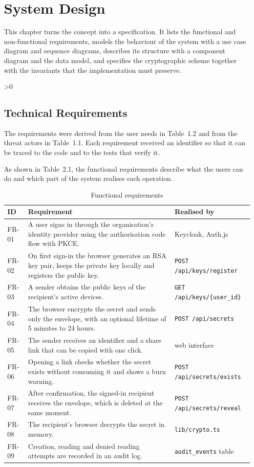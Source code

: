 \documentclass[12pt,a4paper]{article}
\numberwithin{equation}{section}
\numberwithin{figure}{section}
\numberwithin{table}{section}
\newcommand{\subsec}[1]{%
  \ifnum\value{subsection}>0\clearpage\fi
  \subsection{#1}%
}
\newcommand{\tablesetup}{\fontsize{11pt}{13pt}\selectfont\singlespacing\renewcommand{\arraystretch}{1.15}}
\newcommand{\leadin}[1]{%
  {\onehalfspacing\setlength{\parindent}{1.25cm}\indent #1\par}\vspace{8pt}}
\begin{document}
\clearpage
\section{System Design}

This chapter turns the concept into a specification. It lists the functional and non-functional requirements, models the behaviour of the system with a use case diagram and sequence diagrams, describes its structure with a component diagram and the data model, and specifies the cryptographic scheme together with the invariants that the implementation must preserve.

\subsec{Technical Requirements}

The requirements were derived from the user needs in Table~1.2 and from the threat actors in Table~1.1. Each requirement received an identifier so that it can be traced to the code and to the tests that verify it.

\begin{table}[H]
\leadin{As shown in Table~2.1, the functional requirements describe what the users can do and which part of the system realises each operation.}
\tablesetup
\caption{Functional requirements}
\label{tab:fr}
\begin{tabularx}{\textwidth}{|P{0.08\textwidth}|L|P{0.29\textwidth}|}
\hline
\textbf{ID} & \textbf{Requirement} & \textbf{Realised by} \\ \hline
FR-01 & A user signs in through the organisation's identity provider using the authorisation code flow with PKCE. & Keycloak, Auth.js \\ \hline
FR-02 & On first sign-in the browser generates an RSA key pair, keeps the private key locally and registers the public key. & \texttt{POST /api/keys/register} \\ \hline
FR-03 & A sender obtains the public keys of the recipient's active devices. & \texttt{GET /api/keys/\{user\_id\}} \\ \hline
FR-04 & The browser encrypts the secret and sends only the envelope, with an optional lifetime of 5 minutes to 24 hours. & \texttt{POST /api/secrets} \\ \hline
FR-05 & The sender receives an identifier and a share link that can be copied with one click. & web interface \\ \hline
FR-06 & Opening a link checks whether the secret exists without consuming it and shows a burn warning. & \texttt{POST /api/secrets/exists} \\ \hline
FR-07 & After confirmation, the signed-in recipient receives the envelope, which is deleted at the same moment. & \texttt{POST /api/secrets/reveal} \\ \hline
FR-08 & The recipient's browser decrypts the secret in memory. & \texttt{lib/crypto.ts} \\ \hline
FR-09 & Creation, reading and denied reading attempts are recorded in an audit log. & \texttt{audit\_events} table \\ \hline
\end{tabularx}
\end{table}
\end{document}
